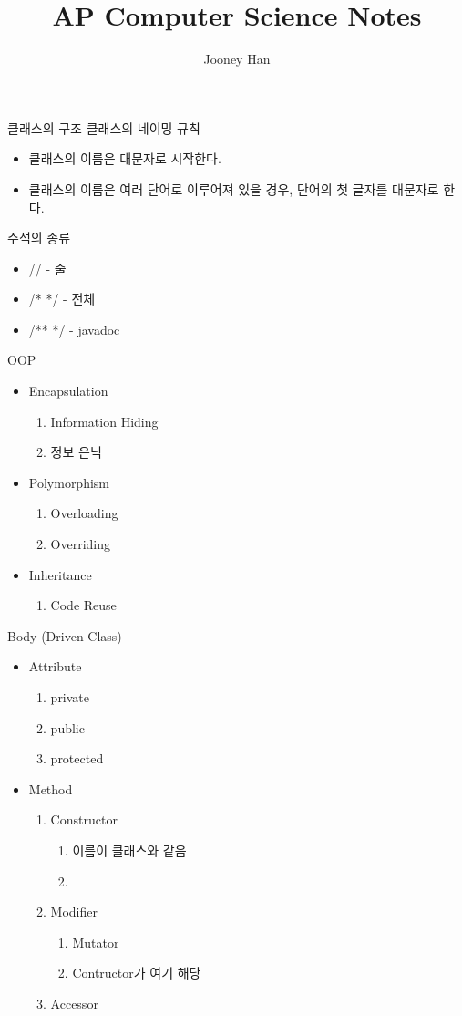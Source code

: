 \documentclass[11pt]{article}
\title{AP Computer Science Notes}
\author{Jooney Han}
\begin{document}
\maketitle
{\Huge 클래스의 구조}
\bigskip
{\Large 클래스의 네이밍 규칙}
\begin{itemize}
    \item 클래스의 이름은 대문자로 시작한다.
    \item 클래스의 이름은 여러 단어로 이루어져 있을 경우, 단어의 첫 글자를 대문자로 한다.
\end{itemize}
\bigskip
{\Large 주석의 종류}
\begin{itemize}
    \item // - 줄
    \item /* */ - 전체
    \item /** */ - javadoc
\end{itemize}
\bigskip
{\Large OOP}
\begin{itemize}
    \item Encapsulation
    \begin{enumerate}
        \item Information Hiding
        \item 정보 은닉
    \end{enumerate}
    \item Polymorphism
    \begin{enumerate}
        \item Overloading
        \item Overriding
    \end{enumerate}
    \item Inheritance
    \begin{enumerate}
        \item Code Reuse
    \end{enumerate}
\end{itemize}
\bigskip
{\Large Body (Driven Class)}
\begin{itemize}
    \item Attribute
    \begin{enumerate}
        \item private
        \item public    
        \item protected
    \end{enumerate}
    \item Method
    \begin{enumerate}
        \item Constructor
        \begin{enumerate}
            \item 이름이 클래스와 같음
            \item 
        \end{enumerate}
        \item Modifier
        \begin{enumerate}
            \item Mutator
            \item Contructor가 여기 해당
        \end{enumerate}
        \item Accessor
    \end{enumerate}
\end{itemize}
\end{document}
